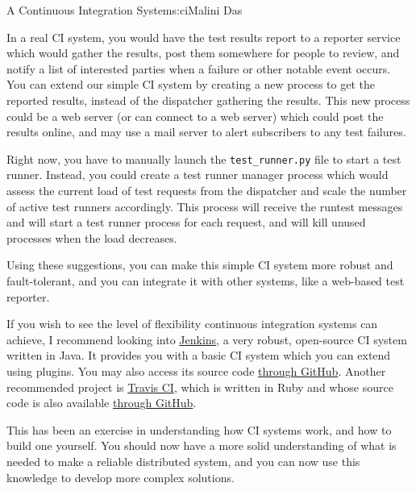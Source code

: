 \begin{aosachapter}{A Continuous Integration System}{s:ci}{Malini Das}
\label{real-reporting}

In a real CI system, you would have the test results report to a
reporter service which would gather the results, post them somewhere for
people to review, and notify a list of interested parties when a failure
or other notable event occurs. You can extend our simple CI system by
creating a new process to get the reported results, instead of the
dispatcher gathering the results. This new process could be a web server
(or can connect to a web server) which could post the results online,
and may use a mail server to alert subscribers to any test failures.

\label{test-runner-manager}

Right now, you have to manually launch the \texttt{test\_runner.py} file
to start a test runner. Instead, you could create a test runner manager
process which would assess the current load of test requests from the
dispatcher and scale the number of active test runners accordingly. This
process will receive the runtest messages and will start a test runner
process for each request, and will kill unused processes when the load
decreases.

Using these suggestions, you can make this simple CI system more robust
and fault-tolerant, and you can integrate it with other systems, like a
web-based test reporter.

If you wish to see the level of flexibility continuous integration
systems can achieve, I recommend looking into
\href{http://jenkins-ci.org/}{Jenkins}, a very robust, open-source CI
system written in Java. It provides you with a basic CI system which you
can extend using plugins. You may also access its source code
\href{https://github.com/jenkinsci/jenkins/}{through GitHub}. Another
recommended project is \href{https://travis-ci.org/}{Travis CI}, which
is written in Ruby and whose source code is also available
\href{https://github.com/travis-ci/travis-ci}{through GitHub}.

This has been an exercise in understanding how CI systems work, and how
to build one yourself. You should now have a more solid understanding of
what is needed to make a reliable distributed system, and you can now
use this knowledge to develop more complex solutions.

\end{aosachapter}
